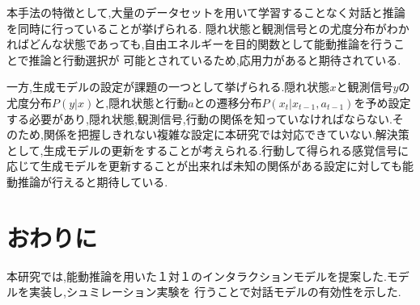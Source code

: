 \documentclass[a4j,10pt,uplatex]{jsarticle}
\begin{document}
本手法の特徴として,大量のデータセットを用いて学習することなく対話と推論を同時に行っていることが挙げられる.
隠れ状態と観測信号との尤度分布がわかればどんな状態であっても,自由エネルギーを目的関数として能動推論を行うことで推論と行動選択が
可能とされているため,応用力があると期待されている.

一方,生成モデルの設定が課題の一つとして挙げられる.隠れ状態$x$と観測信号$y$の尤度分布$P(y|x)$と,隠れ状態と行動$a$との遷移分布$P(x_t|x_{t-1}, a_{t-1})$を予め設定する必要があり,隠れ状態,観測信号,行動の関係を知っていなければならない.そのため,関係を把握しきれない複雑な設定に本研究では対応できていない.解決策として,生成モデルの更新をすることが考えられる.行動して得られる感覚信号に応じて生成モデルを更新することが出来れば未知の関係がある設定に対しても能動推論が行えると期待している.



\section{おわりに}
本研究では,能動推論を用いた１対１のインタラクションモデルを提案した.モデルを実装し,シュミレーション実験を
行うことで対話モデルの有効性を示した.


\footnotesize
   
\end{document}
